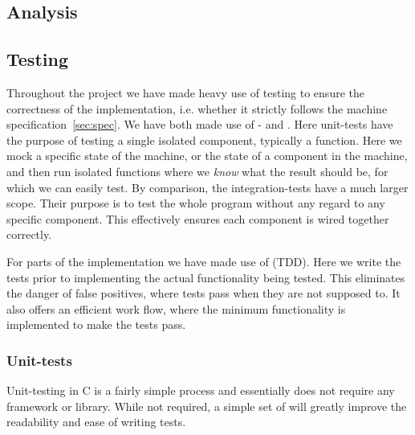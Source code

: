 






\subsection{Analysis}

\subsection{Testing}


Throughout the project we have made heavy use of testing to ensure the
correctness of the implementation, i.e. whether it strictly follows the machine
specification~\ref{sec:spec}. We have both made use of - and
. Here unit-tests have the purpose of testing a single
isolated component, typically a function. Here we mock a specific state of the
machine, or the state of a component in the machine, and then run isolated
functions where we {\it know} what the result should be, for which we can easily
test. By comparison, the integration-tests have a much larger scope. Their
purpose is to test the whole program without any regard to any specific
component. This effectively ensures each component is wired together correctly.

For parts of the implementation we have made use of  (TDD). Here we write the tests prior to implementing the actual
functionality being tested. This eliminates the danger of false positives, where
tests pass when they are not supposed to. It also offers an efficient work flow,
where the minimum functionality is implemented to make the tests pass.

\subsubsection{Unit-tests}
Unit-testing in C is a fairly simple process and essentially does not require
any framework or library. While not required, a simple set of  will
greatly improve the readability and ease of writing tests.

